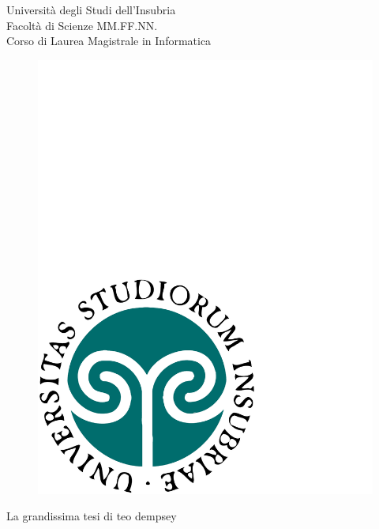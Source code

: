 \begin{titlepage}
  \begin{center}
  \begin{large}
  {\fontsize{20.74}{18}\selectfont\vspace*{0.50cm}Universit\`a degli Studi dell'Insubria}\\
  Facolt\`a di Scienze MM.FF.NN.\\
  Corso di Laurea Magistrale in Informatica
  \end{large}

  \vspace{1cm}
  \begin{figure}[h]
    \begin{center}
      \includegraphics[scale=0.25]{copertina/logounivector.pdf}
    \end{center}
  \end{figure}

    {\fontsize{26}{26}\selectfont\par\vspace*{0.75cm}
    La grandissima tesi
    \vspace{.15em}di teo dempsey}
    \par


\end{center}
\end{titlepage}
